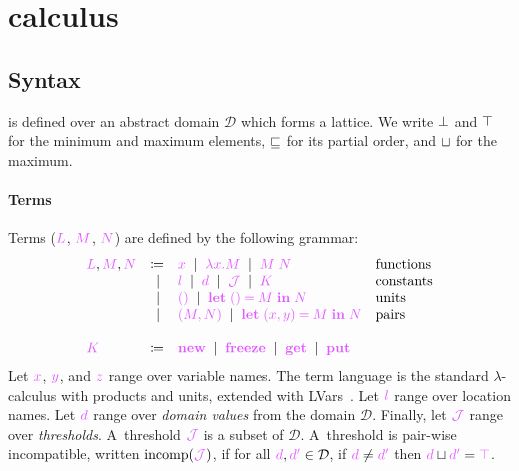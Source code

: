 \documentclass[main.tex]{subfiles}
\begin{document}
\section{\typedlambdalvar calculus}

\subsection{Syntax}%
\typedlambdalvar is defined over an abstract domain $\mathcal{D}$ which forms a lattice. We write ${\bot}$ and ${\top}$ for the minimum and maximum elements, $\mathbin{{\color{black}\sqsubseteq}}$ for its partial order, and $\mathbin{{\color{black}\sqcup}}$ for the maximum.

\paragraph*{Terms}
Terms ($\tm{L}$, $\tm{M}$, $\tm{N}$) are defined by the following grammar:
\[
  \begin{array}{lrll}
  \tm{L}, \tm{M}, \tm{N}
  & \coloneqq & \tm{x}
    \sep        \tm{\lambda x.M}
    \sep        \tm{M\;N}                     & \text{functions} \\
  & \sep      & \tm{l}                        
    \sep        \tm{d}
    \sep        \tmJ
    \sep        \tm{K}                        & \text{constants} \\
  & \sep      & \tm{\unit}                    
    \sep        \tm{\letunit{M}{N}}           & \text{units} \\
  & \sep      & \tm{\pair{M}{N}}              
    \sep        \tm{\letpair{x}{y}{M}{N}}     & \text{pairs}
  \\
  \\
  \tm{K}
  & \coloneqq & \tm{\lvarnew}
    \sep        \tm{\lvarfreeze}
    \sep        \tm{\lvarget}
    \sep        \tm{\lvarput}
\end{array}
\]
Let $\tm{x}$, $\tm{y}$, and $\tm{z}$ range over variable names. The term language is the standard $\lambda$-calculus with products and units, extended with LVars~\citep{kuper15}. Let $\tm{l}$ range over location names. Let $\tm{d}$ range over \emph{domain values} from the domain $\mathcal{D}$. Finally, let $\tmJ$ range over \emph{thresholds}. A~threshold $\tmJ$ is a subset of $\mathcal{D}$. A~threshold is pair-wise incompatible, written $\incomp(\tmJ)$, if for all $\tm{d},\tm{d'}\in\mathcal{D}$, if $\tm{d}\neq\tm{d'}$ then $\tm{d}\sqcup\tm{d'}=\tm{\topD}$.
\end{document}

